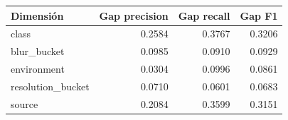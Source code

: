\begin{tabular}{lrrr}
\toprule
\textbf{Dimensión} & \textbf{Gap precision} & \textbf{Gap recall} & \textbf{Gap F1} \\
\midrule
class & 0.2584 & 0.3767 & 0.3206 \\
blur\_bucket & 0.0985 & 0.0910 & 0.0929 \\
environment & 0.0304 & 0.0996 & 0.0861 \\
resolution\_bucket & 0.0710 & 0.0601 & 0.0683 \\
source & 0.2084 & 0.3599 & 0.3151 \\
\bottomrule
\end{tabular}
